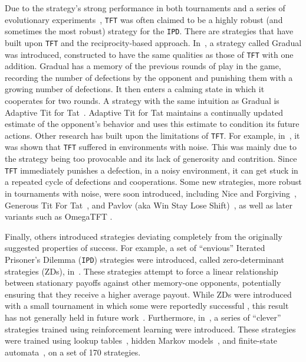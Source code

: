 \documentclass{article}
\def\TFT{\texttt{TFT}}
\def\IPD{\texttt{IPD}}
\begin{document}
Due to the strategy's strong performance in both tournaments and a series of
evolutionary experiments~\cite{Axelrod1981}, \TFT{} was often claimed to be a
highly robust (and sometimes the most robust) strategy for the \IPD.
There are strategies that have built upon \TFT{} and the reciprocity-based
approach. In~\cite{Beaufils1997}, a strategy called Gradual was introduced,
constructed to have the same qualities as those of \TFT{} with one
addition. Gradual has a memory of the previous rounds of play in the game,
recording the number of defections by the opponent and punishing them with a
growing number of defections. It then enters a calming state in which it
cooperates for two rounds. A strategy with the same intuition as Gradual is
Adaptive Tit for Tat~\cite{tzafestas-2000a}. Adaptive Tit for Tat maintains a
continually updated estimate of the opponent's behavior and uses this estimate
to condition its future actions.
Other research has built upon the limitations of \TFT. For example,
in~\cite{Bendor1991, Donninger1986, Molander1985, Hammerstein1984}, it was shown
that \TFT{} suffered in environments with noise. This was mainly due to the
strategy being too provocable and its lack of generosity and contrition. Since
\TFT{} immediately punishes a defection, in a noisy environment, it can get
stuck in a repeated cycle of defections and cooperations. Some new strategies,
more robust in tournaments with noise, were soon introduced, including Nice and
Forgiving~\cite{Bendor1991}, Generous Tit For Tat~\cite{Nowak1992}, and Pavlov
(aka Win Stay Lose Shift)~\cite{Nowak1993}, as well as later variants such as
OmegaTFT \cite{kendall2007iterated}.

Finally, others introduced strategies deviating completely from the originally
suggested properties of success. For example, a set of ``envious'' Iterated
Prisoner's Dilemma (\IPD) strategies were introduced, called zero-determinant
strategies (ZDs), in~\cite{Press2012}. These strategies attempt to force a
linear relationship between stationary payoffs against other memory-one
opponents, potentially ensuring that they receive a higher average payout. While
ZDs were introduced with a small tournament in which some were reportedly
successful \cite{Stewart2012}, this result has not generally held in future
work~\cite{mathieu2017}. Furthermore, in~\cite{Harper2017}, a series of ``clever''
strategies trained using reinforcement learning were introduced. These
strategies were trained using lookup tables~\cite{Axelrod1987}, hidden Markov
models~\cite{Harper2017}, and finite-state automata~\cite{Miller1996}, on
a set of 170 strategies.
\end{document}
